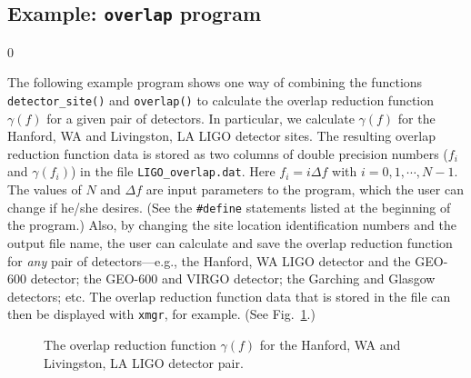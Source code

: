 
\subsection{Example: {\tt overlap} program}
\label{subsec:example_overlap}
\setcounter{equation}0

The following example program shows one way of combining the functions
{\tt detector\_site()} and {\tt overlap()} to calculate 
the overlap reduction function $\gamma(f)$ for a given pair of detectors.
In particular, we calculate $\gamma(f)$ for the Hanford, WA and Livingston, 
LA LIGO detector sites.
The resulting overlap reduction function data is stored as two columns 
of double precision numbers ($f_i$ and $\gamma(f_i)$) in the file 
{\tt LIGO\_overlap.dat}.
Here $f_i=i\Delta f$ with $i=0,1,\cdots,N-1$.
The values of $N$ and $\Delta f$ are input parameters to the program,
which the user can change if he/she desires.
(See the {\tt \#define} statements listed at the beginning of the program.)
Also, by changing the site location identification numbers and the
output file name, the user can calculate and save
the overlap reduction function for {\it any} pair of detectors---e.g.,  
the Hanford, WA LIGO detector and the GEO-600 detector; the GEO-600 
and VIRGO detector; the Garching and Glasgow detectors; etc.
The overlap reduction function data that is stored in the file can 
then be displayed with {\tt xmgr}, for example.
(See Fig.~\ref{f:f1}.)


\begin{figure}[h]
\begin{center}
\caption{\label{f:f1}
The overlap reduction function $\gamma(f)$ for the Hanford, WA and 
Livingston, LA LIGO detector pair.}
\end{center}
\end{figure}

